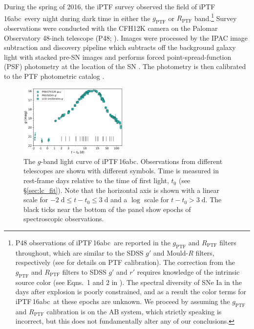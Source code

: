 \documentclass[twocolumn]{aastex61}
\newcommand{\abc}{iPTF\,16abc}
\begin{document}
During the spring of 2016, the iPTF survey observed the field of \abc\ every night during dark time in either the $g_\mathrm{PTF}$ or 
$R_\mathrm{PTF}$ band.\footnote{P48 observations of \abc\ are reported in the $g_\mathrm{PTF}$ and $R_\mathrm{PTF}$ filters throughout, which are similar to the SDSS $g'$ and Mould-$R$ filters, respectively (see \citealt{2012PASP..124..854O} for details on PTF calibration). The correction from the $g_\mathrm{PTF}$ and $R_\mathrm{PTF}$ filters to SDSS $g'$ and $r'$ requires knowledge of the intrinsic source color (see Eqns.~1 and 2 in \citealt{2012PASP..124..854O}). The spectral diversity of SNe Ia in the days after explosion is poorly constrained, and as a result the color terms for \abc\ at these epochs are unknown. We proceed by assuming the $g_\mathrm{PTF}$ and $R_\mathrm{PTF}$ calibration is on the AB system, which strictly speaking is incorrect, but this does not fundamentally alter any of our conclusions.} 
Survey observations were conducted with the
CFH12K camera \citep{2008SPIE.7014E..4YR} on the Palomar Observatory 
48-inch telescope (P48; \citealt{2009PASP..121.1395L}). Images were processed by the IPAC image
subtraction and discovery pipeline which subtracts off the background
galaxy light with stacked pre-SN images and performs forced
point-spread-function (PSF) photometry at the location of the SN 
\citep{2017PASP..129a4002M}. The
photometry is then calibrated to the PTF photometric catalog
\citep{2012PASP..124..854O}.

\begin{figure}[htb]
  \centering
  \includegraphics[width=0.48\textwidth]{logLC_with_colors.pdf}
  \caption{The $g$-band
  light curve of \abc. Observations from different 
  telescopes are shown with different symbols. Time is measured in 
  rest-frame days relative to the time of first light, $t_0$ (see 
  \S\ref{sec:lc_fit}). Note that the horizontal axis is shown with 
  a linear scale for $-2 \; \mathrm{d} \le t - t_0 \le 3 \; 
  \mathrm{d}$ and a $\log$ scale for $t - t_0 > 3 \; \mathrm{d}$. 
  The black ticks near the
  bottom of the panel show epochs of spectroscopic observations.
  }
  \label{fig:lightcurve}
\end{figure}
\end{document}
